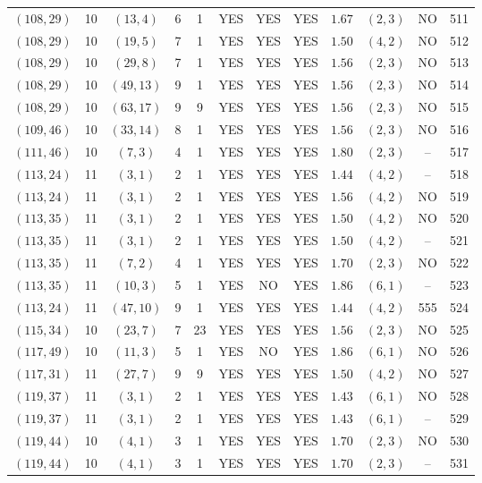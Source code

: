 \begin{longtable}{|c|c|c|c|c|c|c|c|c|c|c|c|}
$(108,29)$ & 10 & $(13,4)$ & 6 & 1 & YES & YES & YES & $1.67$ & $(2,3)$ & NO & 511\\
$(108,29)$ & 10 & $(19,5)$ & 7 & 1 & YES & YES & YES & $1.50$ & $(4,2)$ & NO & 512\\
$(108,29)$ & 10 & $(29,8)$ & 7 & 1 & YES & YES & YES & $1.56$ & $(2,3)$ & NO & 513\\
$(108,29)$ & 10 & $(49,13)$ & 9 & 1 & YES & YES & YES & $1.56$ & $(2,3)$ & NO & 514\\
$(108,29)$ & 10 & $(63,17)$ & 9 & 9 & YES & YES & YES & $1.56$ & $(2,3)$ & NO & 515\\
$(109,46)$ & 10 & $(33,14)$ & 8 & 1 & YES & YES & YES & $1.56$ & $(2,3)$ & NO & 516\\
$(111,46)$ & 10 & $(7,3)$ & 4 & 1 & YES & YES & YES & $1.80$ & $(2,3)$ & -- & 517\\
$(113,24)$ & 11 & $(3,1)$ & 2 & 1 & YES & YES & YES & $1.44$ & $(4,2)$ & -- & 518\\
$(113,24)$ & 11 & $(3,1)$ & 2 & 1 & YES & YES & YES & $1.56$ & $(4,2)$ & NO & 519\\
$(113,35)$ & 11 & $(3,1)$ & 2 & 1 & YES & YES & YES & $1.50$ & $(4,2)$ & NO & 520\\
$(113,35)$ & 11 & $(3,1)$ & 2 & 1 & YES & YES & YES & $1.50$ & $(4,2)$ & -- & 521\\
$(113,35)$ & 11 & $(7,2)$ & 4 & 1 & YES & YES & YES & $1.70$ & $(2,3)$ & NO & 522\\
$(113,35)$ & 11 & $(10,3)$ & 5 & 1 & YES & NO & YES & $1.86$ & $(6,1)$ & -- & 523\\
$(113,24)$ & 11 & $(47,10)$ & 9 & 1 & YES & YES & YES & $1.44$ & $(4,2)$ & 555 & 524\\
$(115,34)$ & 10 & $(23,7)$ & 7 & 23 & YES & YES & YES & $1.56$ & $(2,3)$ & NO & 525\\
$(117,49)$ & 10 & $(11,3)$ & 5 & 1 & YES & NO & YES & $1.86$ & $(6,1)$ & NO & 526\\
$(117,31)$ & 11 & $(27,7)$ & 9 & 9 & YES & YES & YES & $1.50$ & $(4,2)$ & NO & 527\\
$(119,37)$ & 11 & $(3,1)$ & 2 & 1 & YES & YES & YES & $1.43$ & $(6,1)$ & NO & 528\\
$(119,37)$ & 11 & $(3,1)$ & 2 & 1 & YES & YES & YES & $1.43$ & $(6,1)$ & -- & 529\\
$(119,44)$ & 10 & $(4,1)$ & 3 & 1 & YES & YES & YES & $1.70$ & $(2,3)$ & NO & 530\\
$(119,44)$ & 10 & $(4,1)$ & 3 & 1 & YES & YES & YES & $1.70$ & $(2,3)$ & -- & 531\\

\end{longtable}
